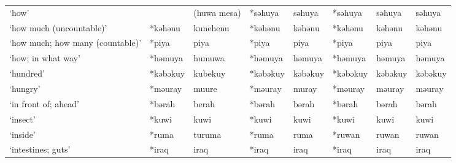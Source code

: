 \begin{landscape}
\begin{longtable}[c]{@{}p{3cm}<{\raggedright}p{2.75cm}<{\raggedright}p{2.75cm}<{\raggedright}p{2.75cm}<{\raggedright}p{2.75cm}<{\raggedright}p{2.75cm}<{\raggedright}p{2.75cm}<{\raggedright}p{2.75cm}<{\raggedright}@{}}
`how'                                                &                    & (huwa mesa)                    & *səhuya            & səhuya                     & *səhuya          & səhuya                   & səhuya                            \\
`how much (uncountable)'                             & *kəhənu            & kunehenu                       & *kəhənu            & kəhənu                     & *kəhənu          & kəhənu                   & kəhənu                            \\
`how much; how many (countable)'                     & *piya              & piya                           & *piya              & piya                       & *piya            & piya                     & piya                              \\
`how; in what way'                                   & *həmuya            & humuwa                         & *həmuya            & həmuya                     & *həmuya          & həmuya                   & həmuya                            \\
`hundred'                                            & *kəbəkuy           & kubekuy                        & *kəbəkuy           & kəbəkuy                    & *kəbəkuy         & kəbəkuy                  & kəbəkuy                           \\
`hungry'                                             & *məuray            & muure                          & *məuray            & muray                      & *məuray          & məuray                   & məuray                            \\
`in front of; ahead'                                 & *bərah             & berah                          & *bərah             & bərah                      & *bərah           & bərah                    & bərah                             \\
`insect'                                             & *kuwi              & kuwi                           & *kuwi              & kuwi                       & *kuwi            & kuwi                     & kuwi                              \\
`inside'                                             & *ruma              & turuma                         & *ruma              & ruma                       & *ruwan           & ruwan                    & ruwan                             \\
`intestines; guts'                                   & *iraq              & iraq                           & *iraq              & iraq                       & *iraq            & iraq                     & iraq                              \\

\end{longtable}
\end{landscape}
